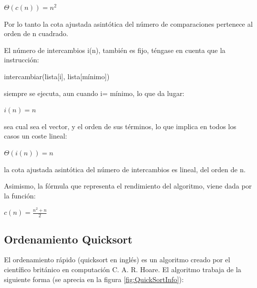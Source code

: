 \documentclass[8pt, A4]{article}    %
\begin{document}
\begin{center}
    ${\displaystyle \Theta (c(n))=n^{2}\;}$
\end{center}

Por lo tanto la cota ajustada asintótica del número de comparaciones pertenece al orden de n cuadrado.

El número de intercambios i(n), también es fijo, téngase en cuenta que la instrucción:

\begin{center}
    intercambiar(lista[i], lista[mínimo])
\end{center}

siempre se ejecuta, aun cuando i= mínimo, lo que da lugar:

\begin{center}
    ${\displaystyle i(n)=n\;}$
\end{center}

sea cual sea el vector, y el orden de sus términos, lo que implica en todos los casos un coste lineal:

\begin{center}
    ${\displaystyle \Theta (i(n))=n\;}$
\end{center}

la cota ajustada asintótica del número de intercambios es lineal, del orden de n.

Asimismo, la fórmula que representa el rendimiento del algoritmo, viene dada por la función:

\begin{center}
    ${\displaystyle c(n)={\frac {n^{2}+n}{2}}}$
\end{center}

\newpage


\subsection{Ordenamiento Quicksort}
El ordenamiento rápido (quicksort en inglés) es un algoritmo creado por el científico británico en computación C. A. R. Hoare.
El algoritmo trabaja de la siguiente forma (se aprecia en la figura \ref{fig:QuickSortInfo}):
\end{document}
